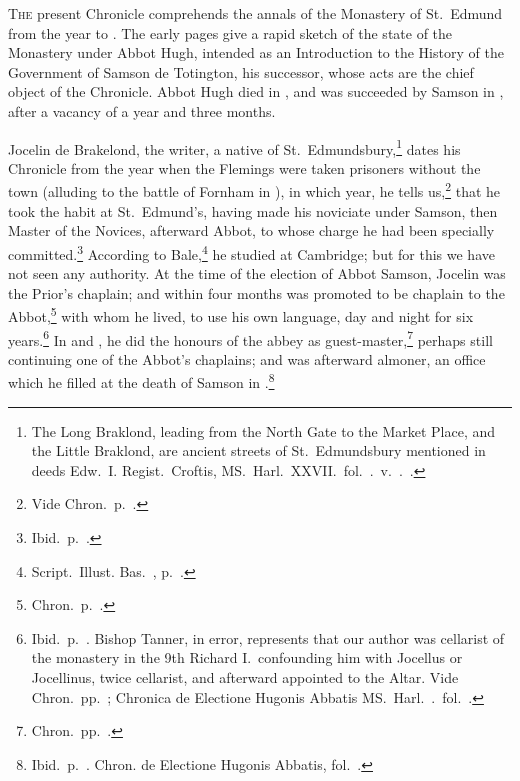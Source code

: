 \documentclass[10pt]{book}
\begin{document}
{\setlength{\parskip}{0.0\baselineskip}\setlength{\parindent}{10pt}

\noindent \textsc{The} present Chronicle comprehends the annals of the Monastery of St.\ Edmund from the year  to . The early pages give a rapid sketch of the state of the Monastery under Abbot Hugh, intended as an Introduction to the History of the Government of Samson de Totington, his successor, whose acts are the chief object of the Chronicle. Abbot Hugh died in , and was succeeded by Samson in , after a vacancy of a year and three months.

Jocelin de Brakelond, the writer, a native of St.\ Edmundsbury,\footnote{The Long Braklond, leading from the North Gate to the Market Place, and the Little Braklond, are ancient streets of St.\ Edmundsbury mentioned in deeds  Edw.\ I. Regist.\ Croftis, MS.\ Harl.\ XXVII.\ fol.\ .\ v.\ .\ .} dates his Chronicle from the year when the Flemings were taken prisoners without the town (alluding to the battle of Fornham in ), in which year, he tells us,\footnote{Vide Chron.\ p.\ .} that he took the habit at St.\ Edmund's, having made his noviciate under Samson, then Master of the Novices, afterward Abbot, to whose charge he had been specially committed.\footnote{Ibid.\ p.\ .} According to Bale,\footnote{Script.\ Illust. Bas.\ , p.\ .} he studied at Cambridge; but for this we have not seen any authority. At the time of the election of Abbot Samson, Jocelin was the Prior's chaplain; and within four months was promoted to be chaplain to the Abbot,\footnote{Chron.\ p.\ .} with whom he lived, to use his own language, day and night for six years.\footnote{Ibid.\ p.\ . Bishop Tanner, in error, represents that our author was cellarist of the monastery in the 9th Richard I.\ confounding him with Jocellus or Jocellinus, twice cellarist, and afterward appointed to the Altar. Vide Chron.\ pp.\ ; Chronica de Electione Hugonis Abbatis MS.\ Harl.\ .\ fol.\ .} In  and , he did the honours of the abbey as guest-master,\footnote{Chron.\ pp.\ .} perhaps still continuing one of the Abbot's chaplains; and was afterward almoner, an office which he filled at the death of Samson in .\footnote{Ibid.\ p.\ . Chron. de Electione Hugonis Abbatis, fol.\ .}

}
\end{document}
